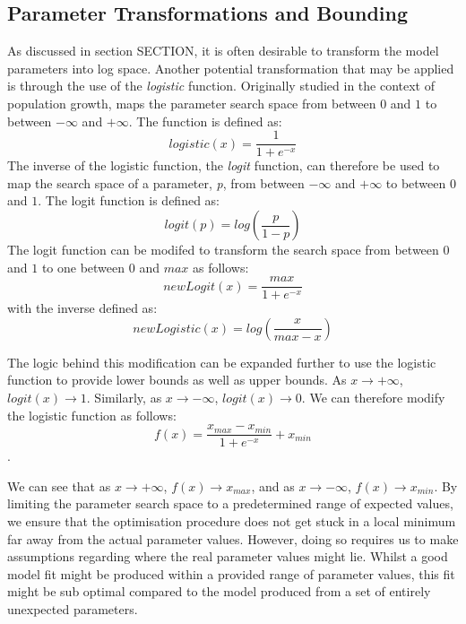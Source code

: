 \subsection{Parameter Transformations and Bounding}
As discussed in section SECTION, it is often desirable to transform the
model parameters into log space. Another potential transformation that may be applied is through the
use of the \emph{logistic} function. Originally studied in the context
of population growth, maps the parameter search space from between $0$ and $1$
to between $-\infty$ and $+\infty$. The function is
defined as:
\begin{equation}
logistic(x)=\frac{1}{1+e^{-x}}
\end{equation}
The inverse of the logistic function, the \emph{logit} function, can
therefore be used to map the search space of a parameter, \emph{p},
from between $-\infty$ and $+\infty$ to between $0$ and $1$. The logit
function is defined as:
\begin{equation}
logit(p) = log(\frac{p}{1-p})
\end{equation}
The logit function can be modifed to transform the search space from
between $0$ and $1$ to one between $0$ and $max$ as follows:
\begin{equation}
newLogit(x) = \frac{max}{1+e^{-x}}
\end{equation}
with the inverse defined as:
\begin{equation}
newLogistic(x)=log(\frac{x}{max-x})
\end{equation}

 The logic behind this modification can be expanded further to use the logistic function to provide lower bounds as well as upper bounds. As
$x\rightarrow +\infty$, $logit(x)\rightarrow 1$. Similarly, as
$x\rightarrow-\infty$, $logit(x)\rightarrow 0$. We can therefore modify
the logistic function as follows:
\begin{equation}
f(x) = \frac{x_{max}-x_{min}}{1+e^{-x}} + x_{min}
\end{equation}.

We can see that as $x\rightarrow +\infty$, $f(x)\rightarrow x_{max}$,
and as $x\rightarrow -\infty$, $f(x)\rightarrow x_{min}$. By limiting
the parameter search space to a predetermined range of expected
values, we ensure that the optimisation procedure does not get stuck
in a local minimum far away from the actual parameter values. However,
doing so requires us to make assumptions regarding where the real
parameter values might lie. Whilst a good model fit might be produced
within a provided range of parameter values, this fit might be sub
optimal compared to the model produced from a set of entirely
unexpected parameters. 

